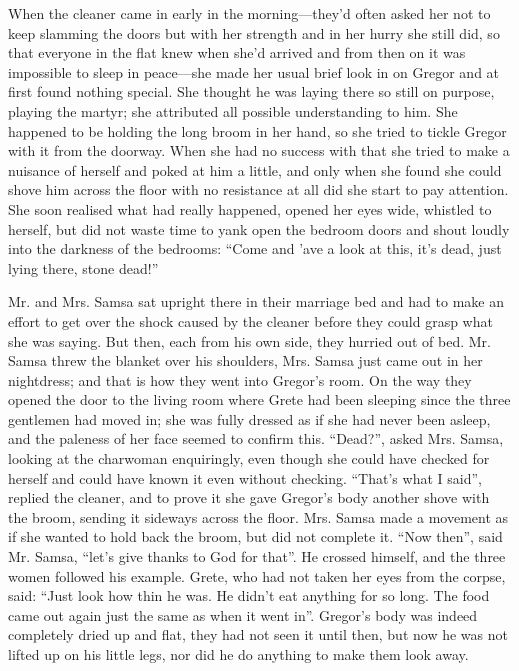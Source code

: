 When the cleaner came in early in the morning—they’d often asked her
not to keep slamming the doors but with her strength and in her hurry
she still did, so that everyone in the flat knew when she’d arrived and
from then on it was impossible to sleep in peace—she made her usual
brief look in on Gregor and at first found nothing special. She thought
he was laying there so still on purpose, playing the martyr; she
attributed all possible understanding to him. She happened to be
holding the long broom in her hand, so she tried to tickle Gregor with
it from the doorway. When she had no success with that she tried to
make a nuisance of herself and poked at him a little, and only when she
found she could shove him across the floor with no resistance at all
did she start to pay attention. She soon realised what had really
happened, opened her eyes wide, whistled to herself, but did not waste
time to yank open the bedroom doors and shout loudly into the darkness
of the bedrooms: “Come and ’ave a look at this, it’s dead, just lying
there, stone dead!”

Mr. and Mrs. Samsa sat upright there in their marriage bed and had to
make an effort to get over the shock caused by the cleaner before they
could grasp what she was saying. But then, each from his own side, they
hurried out of bed. Mr. Samsa threw the blanket over his shoulders,
Mrs. Samsa just came out in her nightdress; and that is how they went
into Gregor’s room. On the way they opened the door to the living room
where Grete had been sleeping since the three gentlemen had moved in;
she was fully dressed as if she had never been asleep, and the paleness
of her face seemed to confirm this. “Dead?”, asked Mrs. Samsa, looking
at the charwoman enquiringly, even though she could have checked for
herself and could have known it even without checking. “That’s what I
said”, replied the cleaner, and to prove it she gave Gregor’s body
another shove with the broom, sending it sideways across the floor.
Mrs. Samsa made a movement as if she wanted to hold back the broom, but
did not complete it. “Now then”, said Mr. Samsa, “let’s give thanks to
God for that”. He crossed himself, and the three women followed his
example. Grete, who had not taken her eyes from the corpse, said: “Just
look how thin he was. He didn’t eat anything for so long. The food came
out again just the same as when it went in”. Gregor’s body was indeed
completely dried up and flat, they had not seen it until then, but now
he was not lifted up on his little legs, nor did he do anything to make
them look away.

